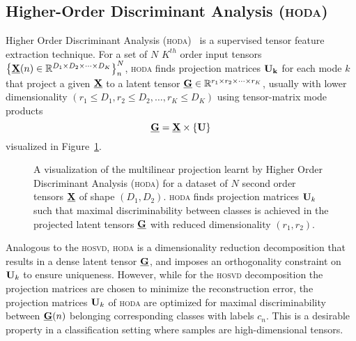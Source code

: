 \documentclass[twocolumn]{article}
\begin{document}
\subsection{Higher-Order Discriminant Analysis (\textsc{hoda})}
Higher Order Discriminant Analysis (\textsc{hoda})~\cite{Phan2010} is a
supervised tensor
feature extraction technique. For a set of $N$ $K^{th}$ order input tensors
$\left\{\underline{\mathbf{X}}(n)\in\mathbb{R}^{D_1\times D_2 \times \cdots \times
D_K}\right\}_n^N$, \textsc{hoda} finds projection matrices $\mathbf{U_k}$ for each mode $k$
that project a given $\underline{\mathbf{X}}$ to a latent tensor
$\underline{\mathbf{G}}\in\mathbb{R}^{r_1\times r_2\times\cdots\times r_K}$, usually with lower
dimensionality $(r_1\leq D_1,r_2\leq D_2,\ldots,r_K\leq D_K)$ using
tensor-matrix mode products
\begin{equation}
	\underline{\mathbf{G}}  = \underline{\mathbf{X}}\times\left\{\mathbf{U}\right\}
	\label{eq:hoda-backward}
\end{equation}
visualized in Figure~\ref{fig:hoda-backward}.
\begin{figure}[t]
	\centering
	
	\caption{A visualization of the multilinear projection learnt by Higher Order
		Discriminant Analysis (\textsc{hoda}) for a dataset of $N$ second order tensors
		$\underline{\mathbf{X}}$ of shape $(D_1,D_2)$.
		\textsc{hoda} finds projection matrices $\mathbf{U}_k$ such that maximal
		discriminability between classes is achieved in the projected latent tensors
		$\underline{\mathbf{G}}$ with reduced dimensionality $(r_1,r_2)$.}
	\label{fig:hoda-backward}
\end{figure}
Analogous to the \textsc{hosvd}, \textsc{hoda} is a dimensionality
reduction decomposition that results in a dense latent tensor $\underline{\mathbf{G}}$, and
imposes an orthogonality constraint on $\mathbf{U}_k$ to ensure uniqueness.
However, while for the \textsc{hosvd} decomposition the projection matrices
are chosen to minimize the reconstruction error, the projection matrices
$\mathbf{U}_k$ of \textsc{hoda} are optimized for maximal discriminability between
$\underline{\mathbf{G}}(n)$ belonging corresponding classes with labels $c_n$.
This is a desirable property in a classification setting where samples are
high-dimensional tensors.
\end{document}
